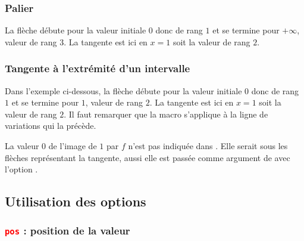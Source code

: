 \subsubsection{Palier}
La flèche débute pour la valeur initiale $0$ donc de rang $1$ et se termine pour $+\infty$, valeur de rang $3$.  La tangente est ici en $x=1$ soit la valeur de rang $2$.

\begin{tkzexample}[vbox]
\end{tkzexample}

\subsubsection{Tangente à l'extrémité d'un intervalle}
Dans l'exemple ci-dessous, la flèche débute pour la valeur initiale $0$ donc de rang $1$ et se termine pour $1$, valeur de rang $2$. La tangente est ici en $x=1$ soit la valeur de rang $2$. Il faut remarquer que la macro  s'applique à la ligne de variations qui la précède.

La valeur $0$ de l'image de $1$ par $f$ n'est pas indiquée dans . Elle serait sous les flèches représentant la tangente, aussi elle est passée comme argument de  avec l'option .

\begin{tkzexample}[vbox]
\end{tkzexample}

\subsection{Utilisation des options}

\subsubsection{\texttt{\textcolor{red}{pos}} : position de la valeur}

